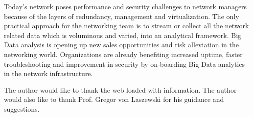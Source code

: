 \documentclass[sigconf]{acmart}
\begin{document}
Today’s network poses performance and security challenges to network managers because of the layers of redundancy, management and virtualization. The only practical approach for the networking team is to stream or collect all the network related data which is voluminous and varied, into an analytical framework. Big Data analysis is opening up new sales opportunities and risk alleviation in the networking world. Organizations are already benefiting increased uptime, faster troubleshooting and improvement in security by on-boarding Big Data analytics in the network infrastructure.

\begin{acks}

The author would like to thank the web loaded with information. The author would also like to thank Prof. Gregor von Laszewski for his guidance and suggestions.

\end{acks}


 
\end{document}
